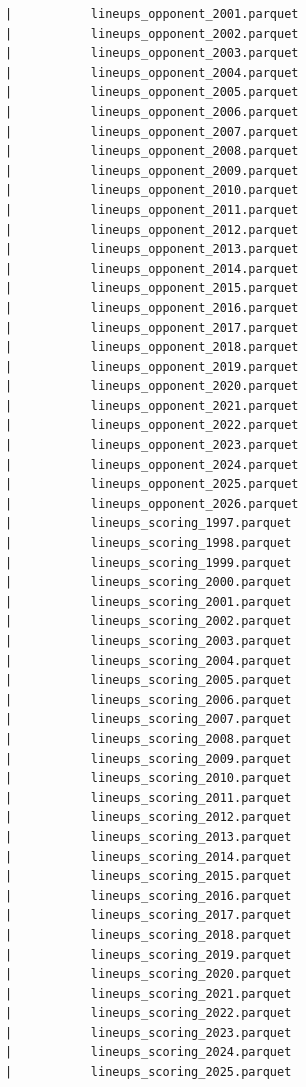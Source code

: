 \begin{lstlisting}
      |           lineups_opponent_2001.parquet
      |           lineups_opponent_2002.parquet
      |           lineups_opponent_2003.parquet
      |           lineups_opponent_2004.parquet
      |           lineups_opponent_2005.parquet
      |           lineups_opponent_2006.parquet
      |           lineups_opponent_2007.parquet
      |           lineups_opponent_2008.parquet
      |           lineups_opponent_2009.parquet
      |           lineups_opponent_2010.parquet
      |           lineups_opponent_2011.parquet
      |           lineups_opponent_2012.parquet
      |           lineups_opponent_2013.parquet
      |           lineups_opponent_2014.parquet
      |           lineups_opponent_2015.parquet
      |           lineups_opponent_2016.parquet
      |           lineups_opponent_2017.parquet
      |           lineups_opponent_2018.parquet
      |           lineups_opponent_2019.parquet
      |           lineups_opponent_2020.parquet
      |           lineups_opponent_2021.parquet
      |           lineups_opponent_2022.parquet
      |           lineups_opponent_2023.parquet
      |           lineups_opponent_2024.parquet
      |           lineups_opponent_2025.parquet
      |           lineups_opponent_2026.parquet
      |           lineups_scoring_1997.parquet
      |           lineups_scoring_1998.parquet
      |           lineups_scoring_1999.parquet
      |           lineups_scoring_2000.parquet
      |           lineups_scoring_2001.parquet
      |           lineups_scoring_2002.parquet
      |           lineups_scoring_2003.parquet
      |           lineups_scoring_2004.parquet
      |           lineups_scoring_2005.parquet
      |           lineups_scoring_2006.parquet
      |           lineups_scoring_2007.parquet
      |           lineups_scoring_2008.parquet
      |           lineups_scoring_2009.parquet
      |           lineups_scoring_2010.parquet
      |           lineups_scoring_2011.parquet
      |           lineups_scoring_2012.parquet
      |           lineups_scoring_2013.parquet
      |           lineups_scoring_2014.parquet
      |           lineups_scoring_2015.parquet
      |           lineups_scoring_2016.parquet
      |           lineups_scoring_2017.parquet
      |           lineups_scoring_2018.parquet
      |           lineups_scoring_2019.parquet
      |           lineups_scoring_2020.parquet
      |           lineups_scoring_2021.parquet
      |           lineups_scoring_2022.parquet
      |           lineups_scoring_2023.parquet
      |           lineups_scoring_2024.parquet
      |           lineups_scoring_2025.parquet

\end{lstlisting}
